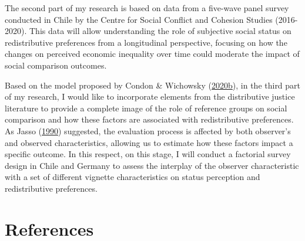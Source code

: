 \documentclass[
  12pt,
]{book}
\begin{document}
The second part of my research is based on data from a five-wave panel survey conducted in Chile by the Centre for Social Conflict and Cohesion Studies (2016-2020). This data will allow understanding the role of subjective social status on redistributive preferences from a longitudinal perspective, focusing on how the changes on perceived economic inequality over time could moderate the impact of social comparison outcomes.

Based on the model proposed by Condon \& Wichowsky (\protect\hyperlink{ref-Condon2020}{2020}\protect\hyperlink{ref-Condon2020}{b}), in the third part of my research, I would like to incorporate elements from the distributive justice literature to provide a complete image of the role of reference groups on social comparison and how these factors are associated with redistributive preferences. As Jasso (\protect\hyperlink{ref-Jasso1990}{1990}) suggested, the evaluation process is affected by both observer's and observed characteristics, allowing us to estimate how these factors impact a specific outcome. In this respect, on this stage, I will conduct a factorial survey design in Chile and Germany to assess the interplay of the observer characteristic with a set of different vignette characteristics on status perception and redistributive preferences.

\hypertarget{references}{%
\chapter*{References}\label{references}}
\end{document}
